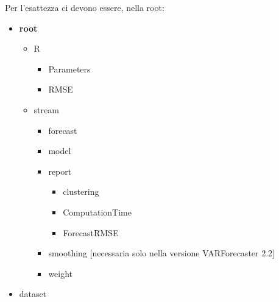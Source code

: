 \documentclass[12pt,a4paper,oneside,openright]{book}
\begin{document}
Per l'esattezza ci devono essere, nella root:
\begin{itemize}
\item \textbf{root}
\begin{itemize}
\item R
\begin{itemize}
\item Parameters
\item RMSE
\end{itemize}
\item stream
\begin{itemize}
\item forecast
\item model
\item report
\begin{itemize}
\item clustering
\item ComputationTime
\item ForecastRMSE
\end{itemize}
\item smoothing [necessaria solo nella versione VARForecaster 2.2]
\item weight
\end{itemize}
\end{itemize}
\item dataset
\end{itemize}
\end{document}
